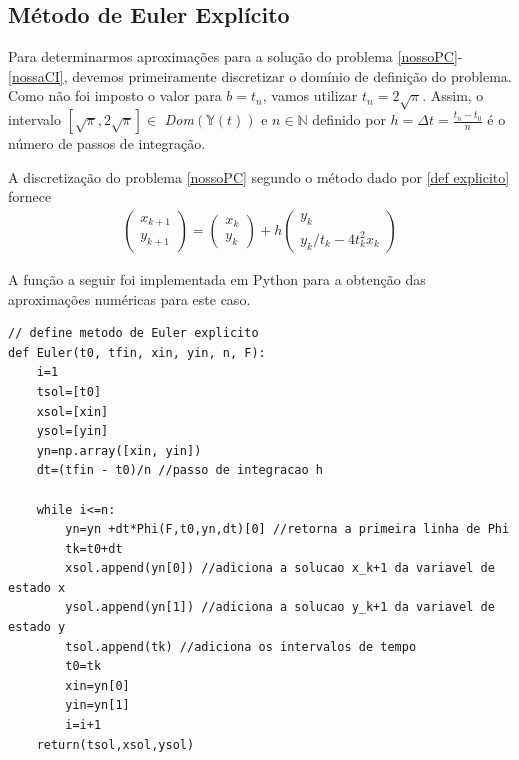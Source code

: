 \documentclass[amsmath,amssymb,floatfix]{revtex4}
\begin{document}
\subsection{Método de Euler Explícito}\label{sec:explicito}
Para determinarmos aproximações para a solução do problema \eqref{nossoPC}-\eqref{nossaCI}, devemos primeiramente discretizar o domínio de definição do problema. Como não foi imposto o valor para $b = t_n$, vamos utilizar $t_n = 2\sqrt{\pi}$. Assim, o intervalo $[\sqrt{\pi}, 2\sqrt{\pi}] \in$ \textit{Dom}$(\mathbb{Y}(t))$ e $n \in \mathbb{N}$ definido por $h = \Delta t = \frac{t_n - t_0}{n}$ é o número de passos de integração.

A discretização do problema \eqref{nossoPC} segundo o método dado por \eqref{def explicito} fornece 
\begin{eqnarray}\label{Explicito}
\begin{pmatrix}  x_{k+1} \\ y_{k+1} \end{pmatrix}
 = \begin{pmatrix} x_k\\ y_k \end{pmatrix}
 +h \begin{pmatrix} y_k \\ y_k/t_k - 4t^2_{k}x_k
 \end{pmatrix}
 \end{eqnarray}

A função a seguir foi implementada em Python para a obtenção das aproximações numéricas para este caso.
\begin{lstlisting}
// define metodo de Euler explicito
def Euler(t0, tfin, xin, yin, n, F):
    i=1
    tsol=[t0]
    xsol=[xin]
    ysol=[yin]
    yn=np.array([xin, yin])
    dt=(tfin - t0)/n //passo de integracao h

    while i<=n:
        yn=yn +dt*Phi(F,t0,yn,dt)[0] //retorna a primeira linha de Phi
        tk=t0+dt
        xsol.append(yn[0]) //adiciona a solucao x_k+1 da variavel de estado x
        ysol.append(yn[1]) //adiciona a solucao y_k+1 da variavel de estado y
        tsol.append(tk) //adiciona os intervalos de tempo 
        t0=tk
        xin=yn[0]
        yin=yn[1]
        i=i+1
    return(tsol,xsol,ysol)
\end{lstlisting}
\end{document}
